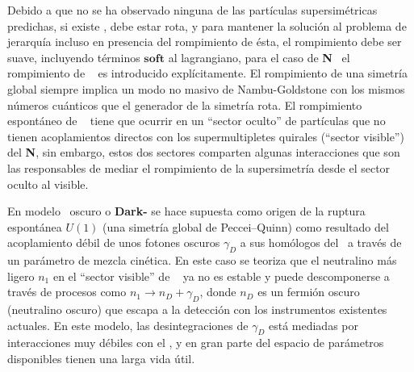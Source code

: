 Debido a que no se ha observado ninguna de las partículas supersimétricas predichas, si existe \SUSY, debe estar rota, y para mantener la solución al problema de jerarquía incluso en presencia del rompimiento de ésta, el rompimiento debe ser suave, incluyendo términos $\mathbf{soft}$ al lagrangiano, para el caso de \textbf{N}\MSSM ~ el rompimiento de \SUSY ~ es introducido explícitamente. El rompimiento de una simetría global siempre implica un modo no masivo de Nambu-Goldstone con los mismos números cuánticos que el generador de la simetría rota. %
El rompimiento espontáneo de \SUSY ~ tiene que ocurrir en un ``sector oculto'' de partículas que no tienen acoplamientos directos con los supermultipletes quirales (``sector visible'') del \textbf{N}\MSSM, sin embargo, estos dos sectores comparten algunas interacciones que son las responsables de mediar el rompimiento de la supersimetría desde el sector oculto al visible.

En modelo \SUSY ~oscuro o \textbf{Dark-\SUSY} se hace supuesta como origen de la ruptura espontánea $U(1)$ (una simetría global de Peccei–Quinn) como resultado del acoplamiento débil de unos fotones oscuros $\gamma_D$ a sus homólogos del \ME ~a través de un parámetro de mezcla cinética. En este caso se teoriza que el neutralino más ligero $n_1$ en el ``sector visible'' de \SUSY ~ ya no es estable y puede descomponerse a través de procesos como $n_1\longrightarrow  n_D + \gamma_D$, donde $n_D$ es un fermión oscuro (neutralino oscuro) que escapa a la detección con los instrumentos existentes actuales. En este modelo, las desintegraciones de $\gamma_D$ está mediadas por interacciones muy débiles con el \ME, y en gran parte del espacio de parámetros disponibles tienen una larga vida útil. %

